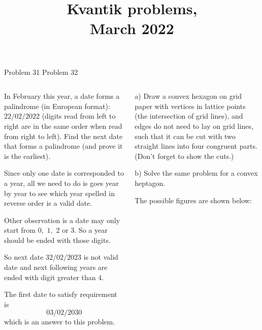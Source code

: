 \documentclass[9pt,aspectratio=169]{beamer}
\title{Kvantik problems,\\ March 2022}
\begin{document}
\maketitle

\begin{frame}{Problem 31 \hspace*{5cm} Problem 32}
  \begin{columns}[T]
    \begin{column}{0.5\textwidth}
      \begin{problem}
        In February this year, a date forms a palindrome (in European format): $22/02/2022$ (digits read from left to right are in the same order when read from right to left). Find the next date that forms a palindrome (and prove it is the earliest). 
      \end{problem}
      Since only one date is corresponded to a year, all we need to do is goes year by year to see which year spelled in reverse order is a valid date. 

      Other observation is a date may only start from $0,$ $1,$ $2$ or $3.$ So a year should be ended with those digits.

      So next date $32/02/2023$ is not valid date and next following years are ended with digit greater than $4$. 

      \medskip
      The first date to satisfy requirement is 
      \[03/02/2030\]
      which is an answer to this problem.
    \end{column}
    \begin{column}{0.5\textwidth}
      \begin{problem}
        a) Draw a convex hexagon on grid paper with vertices in lattice points (the intersection of grid lines), and edges do not need to lay on grid lines, such that it can be cut with two straight lines into four congruent parts. (Don't forget to show the cuts.)

        b) Solve the same problem for a convex heptagon.
      \end{problem}
      The possible figures are shown below:


\end{column}
\end{columns}
\end{frame}
\end{document}
